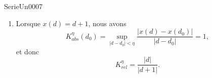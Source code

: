 \begin{corrige}{SerieUn0007}
\begin{enumerate}
		\item
			Lorsque $x(d)=d+1$, nous avons
			\begin{equation}
				K^{\eta}_{abs}(d_0)=\sup_{| d-d_0 |<\eta}\frac{ | x(d)-x(d_0) | }{ | d-d_0 | }=1,
			\end{equation}
			et donc
			\begin{equation}
				K^{\eta}_{rel}=\frac{| d| }{ |d+1| }.
			\end{equation}

	\end{enumerate}

\end{corrige}
